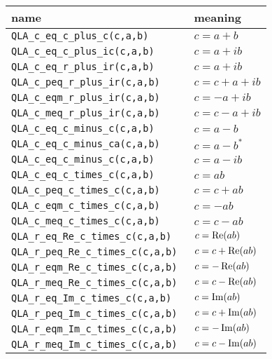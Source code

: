 \documentclass{article}
\renewcommand{\Re}{\mathop{\rm Re}}
\renewcommand{\Im}{\mathop{\rm Im}}
\begin{document}
\begin{center}
\begin{tabular}{|l|l|}
\hline
  name           & meaning      \\
\hline
\verb|QLA_c_eq_c_plus_c(c,a,b)      | & $ c = a + b                       $ \\
\verb|QLA_c_eq_c_plus_ic(c,a,b)     | & $ c = a + ib                      $ \\
\verb|QLA_c_eq_r_plus_ir(c,a,b)     | & $ c = a+ib                        $ \\
\verb|QLA_c_peq_r_plus_ir(c,a,b)    | & $ c = c + a+ib                    $ \\
\verb|QLA_c_eqm_r_plus_ir(c,a,b)    | & $ c =- a+ib                       $ \\
\verb|QLA_c_meq_r_plus_ir(c,a,b)    | & $ c = c - a+ib                    $ \\
\verb|QLA_c_eq_c_minus_c(c,a,b)     | & $ c = a - b                       $ \\
\verb|QLA_c_eq_c_minus_ca(c,a,b)    | & $ c = a - b^*                     $ \\
\verb|QLA_c_eq_c_minus_c(c,a,b)     | & $ c = a - ib                      $ \\
\verb|QLA_c_eq_c_times_c(c,a,b)     | & $ c = ab                          $ \\
\verb|QLA_c_peq_c_times_c(c,a,b)    | & $ c = c + ab                      $ \\
\verb|QLA_c_eqm_c_times_c(c,a,b)    | & $ c = -ab                         $ \\
\verb|QLA_c_meq_c_times_c(c,a,b)    | & $ c = c -  ab                     $ \\
\verb|QLA_r_eq_Re_c_times_c(c,a,b)  | & $ c = \Re(ab)                     $ \\
\verb|QLA_r_peq_Re_c_times_c(c,a,b) | & $ c = c + \Re(ab)                 $ \\
\verb|QLA_r_eqm_Re_c_times_c(c,a,b) | & $ c = -\Re(ab)                    $ \\
\verb|QLA_r_meq_Re_c_times_c(c,a,b) | & $ c = c -  \Re(ab)                $ \\
\verb|QLA_r_eq_Im_c_times_c(c,a,b)  | & $ c = \Im(ab)                     $ \\
\verb|QLA_r_peq_Im_c_times_c(c,a,b) | & $ c = c + \Im(ab)                 $ \\
\verb|QLA_r_eqm_Im_c_times_c(c,a,b) | & $ c = -\Im(ab)                    $ \\
\verb|QLA_r_meq_Im_c_times_c(c,a,b) | & $ c = c -  \Im(ab)                $ \\

\end{tabular}
\end{center}
\end{document}
